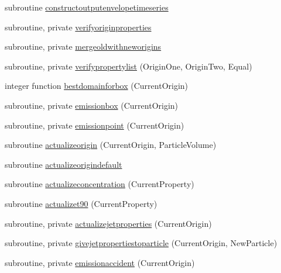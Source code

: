 \begin{DoxyCompactItemize}
\item 
subroutine \mbox{\hyperlink{namespacemodulelagrangianglobal_ac9b3291ed411a75cceb9948f7f671764}{constructoutputenvelopetimeseries}}
\item 
subroutine, private \mbox{\hyperlink{namespacemodulelagrangianglobal_a665e00ca13f06e06edf9476f18ec2b58}{verifyoriginproperties}}
\item 
subroutine, private \mbox{\hyperlink{namespacemodulelagrangianglobal_a615ab3a1eadb5c6d09f9fe8642d2c59f}{mergeoldwithneworigins}}
\item 
subroutine, private \mbox{\hyperlink{namespacemodulelagrangianglobal_a2f8a821bfd65da179345d2d6813fb1e3}{verifypropertylist}} (Origin\+One, Origin\+Two, Equal)
\item 
integer function \mbox{\hyperlink{namespacemodulelagrangianglobal_a88f19e8e5a4b9ce0cfe45715a5e96dbc}{bestdomainforbox}} (Current\+Origin)
\item 
subroutine, private \mbox{\hyperlink{namespacemodulelagrangianglobal_ad983b6fdc70e80cc81cd4c13a69b7f1f}{emissionbox}} (Current\+Origin)
\item 
subroutine, private \mbox{\hyperlink{namespacemodulelagrangianglobal_a9d524fab1163e87ac878a520ae670bf9}{emissionpoint}} (Current\+Origin)
\item 
subroutine \mbox{\hyperlink{namespacemodulelagrangianglobal_a2922324362ebb3dd949bc869b16e90b9}{actualizeorigin}} (Current\+Origin, Particle\+Volume)
\item 
subroutine \mbox{\hyperlink{namespacemodulelagrangianglobal_acd7b83696893d6d898a278da13db5768}{actualizeorigindefault}}
\item 
subroutine \mbox{\hyperlink{namespacemodulelagrangianglobal_a9011e7719eb353ee72ecbd6bce3e7ac1}{actualizeconcentration}} (Current\+Property)
\item 
subroutine \mbox{\hyperlink{namespacemodulelagrangianglobal_a56f5f58e1be0e429b3e792cfd510ddb0}{actualizet90}} (Current\+Property)
\item 
subroutine, private \mbox{\hyperlink{namespacemodulelagrangianglobal_a26ef74f75ff18c16e01e326e85d7920c}{actualizejetproperties}} (Current\+Origin)
\item 
subroutine, private \mbox{\hyperlink{namespacemodulelagrangianglobal_a24724892759ef0c6bdbe24cb1ecfd00b}{givejetpropertiestoparticle}} (Current\+Origin, New\+Particle)
\item 
subroutine, private \mbox{\hyperlink{namespacemodulelagrangianglobal_a8a8675b6cb7d5395b650391ce4ac3fac}{emissionaccident}} (Current\+Origin)

\end{DoxyCompactItemize}
